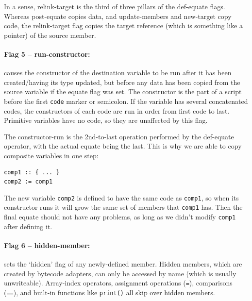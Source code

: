 \documentclass{article}
\newenvironment{code}{
       \begin{list}{}{
               \setlength{\leftmargin}{.4in}
               \setlength{\rightmargin}{0in}
               \setlength{\topsep}{.2in}
       }
       \small
       \item[] }
       { \end{list}   }
\begin{document}
In a sense, relink-target is the third of three pillars of the def-equate flags.  Whereas post-equate copies data, and update-members and new-target copy code, the relink-target flag copies the target reference (which is something like a pointer) of the source member.\\


\paragraph{Flag 5 -- run-constructor:}  causes the constructor of the destination variable to be run after it has been created/having its type updated, but before any data has been copied from the source variable if the equate flag was set.  The constructor is the part of a script before the first \verb#code# marker or semicolon.  If the variable has several concatenated codes, the constructors of each code are run in order from first code to last.  Primitive variables have no code, so they are unaffected by this flag.

The constructor-run is the 2nd-to-last operation performed by the def-equate operator, with the actual equate being the last.  This is why we are able to copy composite variables in one step:

\begin{code} \begin{verbatim}
comp1 :: { ... }
comp2 := comp1
\end{verbatim} \end{code}

\noindent The new variable \verb#comp2# is defined to have the same code as \verb#comp1#, so when its constructor runs it will grow the same set of members that \verb#comp1# has.  Then the final equate should not have any problems, as long as we didn't modify \verb#comp1# after defining it.\\


\paragraph{Flag 6 -- hidden-member:}  sets the `hidden' flag of any newly-defined member.  Hidden members, which are created by bytecode adapters, can only be accessed by name (which is usually unwriteable).  Array-index operators, assignment operations (\verb#=#), comparisons (\verb#==#), and built-in functions like \verb#print()# all skip over hidden members.\\
\end{document}
